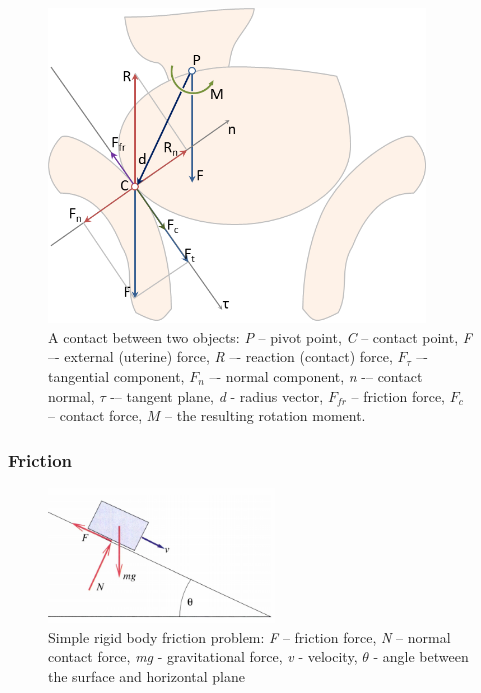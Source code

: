 \begin{figure}
\begin{center}
\includegraphics[width=100mm]{sections/methodology/images/basic/contact.png}
\caption[A contact between two objects.]{\label{contact} A contact between two objects: \emph{P} -- pivot point, \emph{C} -- contact point,  \emph{F} –- external (uterine) force, \emph{R} –- reaction (contact) force, $F_\tau$ –- tangential component, $F_n$ –- normal component, \emph{n} -– contact normal, $\tau$ -– tangent plane, \emph{d} - radius vector, $F_{fr}$ -- friction force, $F_{c}$ -- contact force, $M$ -- the resulting rotation moment.}
\end{center}
\end{figure}


\subsubsection{Friction}

\begin{figure}
  \centering
    \includegraphics[width=60mm]{sections/methodology/images/basic/friction.png}
\caption[Simple rigid body friction problem.]{\label{frictionFig} Simple rigid body friction problem: \emph{F} – friction force, \emph{N} – normal contact force, \emph{mg} - gravitational force, \emph{v} - velocity, $\theta$ - angle between the surface and horizontal plane \citep{RIGIDBODY}}
\end{figure}




